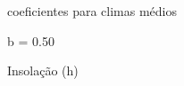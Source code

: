 \documentclass[
]{book}
\newenvironment{Shaded}{\begin{snugshade}}{\end{snugshade}}
\newcommand{\FloatTok}[1]{\textcolor[rgb]{0.00,0.00,0.81}{#1}}
\newcommand{\NormalTok}[1]{#1}
\newcommand{\OperatorTok}[1]{\textcolor[rgb]{0.81,0.36,0.00}{\textbf{#1}}}
\newcommand{\StringTok}[1]{\textcolor[rgb]{0.31,0.60,0.02}{#1}}
\begin{document}
coeficientes para climas médios

\begin{Shaded}
\begin{Highlighting}[]
\NormalTok{ b =}\StringTok{ }\FloatTok{0.50}
\end{Highlighting}
\end{Shaded}

Insolação (h)

\begin{Shaded}
\end{Shaded}
\end{document}

